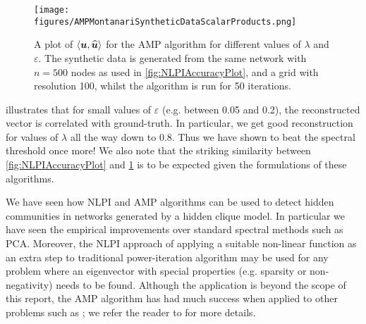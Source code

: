 
\begin{figure}
	\centering
	\texttt{[image: figures/AMPMontanariSyntheticDataScalarProducts.png]}
	\caption[Plot of accuracy for AMP algorithm.]{\label{fig:AMPAccuracyPlot} A plot of $\innerP{\vecvar{u},\widehat{\vecvar{u}}}$ for the AMP algorithm for different values of $\lambda$ and $\varepsilon$. The synthetic data is generated from the same network with $n=500$ nodes as used in \cref{fig:NLPIAccuracyPlot}, and a grid with resolution 100, whilst the algorithm is run for 50 iterations.}
\end{figure}

 illustrates that for small values of $\varepsilon$ (e.g. between 0.05 and 0.2), the reconstructed vector is correlated with ground-truth.
In particular, we get good reconstruction for values of $\lambda$ all the way down to 0.8. Thus we have shown to beat the spectral threshold once more!
We also note that the striking similarity between \cref{fig:NLPIAccuracyPlot} and \cref{fig:AMPAccuracyPlot} is to be expected given the formulations of these algorithms.

We have seen how NLPI and AMP algorithms can be used to detect hidden communities in networks generated by a hidden clique model.
In particular we have seen the empirical improvements over standard spectral methods such as PCA.
Moreover, the NLPI approach of applying a suitable non-linear function as an extra step to traditional power-iteration algorithm may be used for any problem where an eigenvector with special properties (e.g. sparsity or non-negativity) needs to be found.
Although the application is beyond the scope of this report, the AMP algorithm has had much success when applied to other problems such as ; we refer the reader to \cite{DMM09,MDM10,BM11,Mon11,BKS13} for more details. 